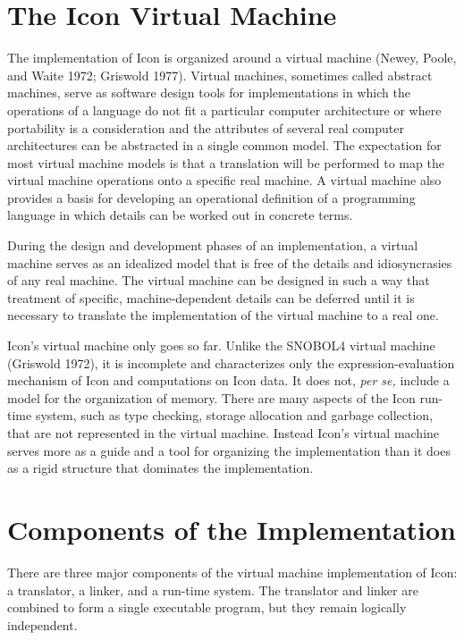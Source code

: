 \section{The Icon Virtual Machine}

The implementation of Icon is organized around a virtual machine
(Newey, Poole, and Waite 1972; Griswold 1977). Virtual machines,
sometimes called abstract machines, serve as software design tools for
implementations in which the operations of a language do not fit a
particular computer architecture or where portability is a
consideration and the attributes of several real computer
architectures can be abstracted in a single common model. The
expectation for most virtual machine models is that a translation will
be performed to map the virtual machine operations onto a specific
real machine. A virtual machine also provides a basis for developing
an operational definition of a programming language in which details
can be worked out in concrete terms.

During the design and development phases of an implementation, a
virtual machine serves as an idealized model that is free of the
details and idiosyncrasies of any real machine. The virtual machine
can be designed in such a way that treatment of specific,
machine-dependent details can be deferred until it is necessary to
translate the implementation of the virtual machine to a real one.

Icon's virtual machine only goes so far. Unlike the SNOBOL4 virtual
machine (Griswold 1972), it is incomplete and characterizes only the
expression-evaluation mechanism of Icon and computations on Icon
data. It does not, \textit{per se, }include a model for the
organization of memory. There are many aspects of the Icon run-time
system, such as type checking, storage allocation and garbage
collection, that are not represented in the virtual machine. Instead
Icon's virtual machine serves more as a guide and a tool for
organizing the implementation than it does as a rigid structure that
dominates the implementation.


\section{\textbf{Components of the Implementation}}

There are three major components of the virtual machine implementation
of Icon: a translator, a linker, and a run-time system. The translator
and linker are combined to form a single executable program, but they
remain logically independent.

